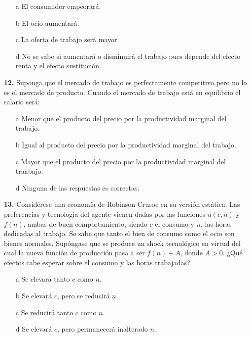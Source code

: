 \documentclass{nuevotema}
\begin{document}
\begin{enumerate}
	\item[a] El consumidor empeorará.
	\item[b] El ocio aumentará.
	\item[c] La oferta de trabajo será mayor.
	\item[d] No se sabe si aumentará o disminuirá el trabajo pues depende del efecto renta y el efecto sustitución.
\end{enumerate}


\textbf{12.} Suponga que el mercado de trabajo es perfectamente competitivo pero no lo es el mercado de producto. Cuando el mercado de trabajo está en equilibrio el salario será:
\begin{enumerate}
	\item[a] Menor que el producto del precio por la productividad marginal del trabajo.
	\item[b] Igual al producto del precio por la productividad marginal del trabajo.
	\item[c] Mayor que el producto del precio por la productividad marginal del traabajo.
	\item[d] Ninguna de las respuestas es correctas.
\end{enumerate}


\textbf{13.} Considérese una economía de Robinson Crusoe en su versión estática. Las preferencias y tecnología del agente vienen dadas por las funciones $u(c,n)$ y $f(n)$, ambas de buen comportamiento, siendo $c$ el consumo y $n$, las horas dedicadas al trabajo. Se sabe que tanto el bien de consumo como el ocio son bienes normales. Supóngase que se produce un shock tecnológico en virtud del cual la nueva función de producción pasa a ser $f(n) + A$, donde $A > 0$. ¿Qué efectos cabe esperar sobre el consumo y las horas trabajadas?
\begin{enumerate}
	\item[a] Se elevará tanto $c$ como $n$.
	\item[b] Se elevará $c$, pero se reducirá $n$.
	\item[c] Se reducirá tanto $c$ como $n$.
	\item[d] Se elevará $c$, pero permanecerá inalterado $n$.
\end{enumerate}

\end{document}
